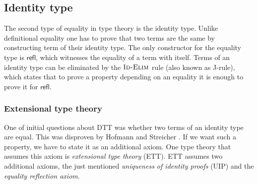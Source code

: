 \subsection{Identity type}


The second type of equality in type theory is the identity type. Unlike definitional equality one has to prove that two terms are the same by constructing term of their identity type. The only constructor for the equality type is $\mathsf{refl}$, which witnesses the equality of a term with itself. Terms of an identity type can be eliminated by the $\textsc{Id-Elim}$ rule (also known as J-rule), which states that to prove a property depending on an equality it is enough to prove it for $\mathsf{refl}$.

\subsubsection{Extensional type theory}\label{sec:ext}

One of initial questions about DTT was whether two terms of an identity type are equal. This was disproven by Hofmann and Streicher \cite{hofmann1998groupoid}. If we want such a property, we have to state it as an additional axiom. One type theory that assumes this axiom is \emph{extensional type theory} (ETT). ETT assumes two additional axioms, the just mentioned \emph{uniqueness of identity proofs} (UIP) and the \emph {equality reflection axiom}.

